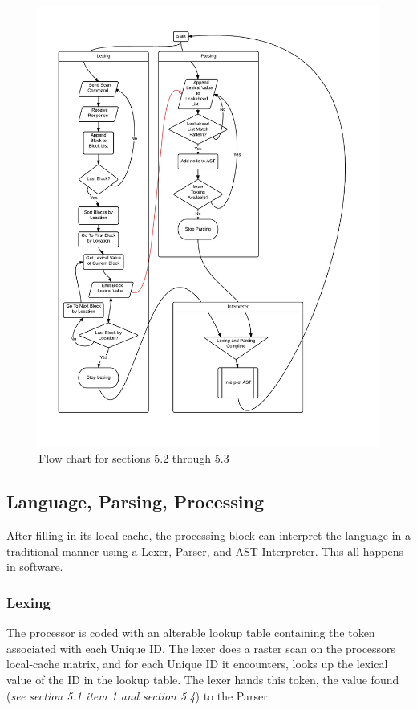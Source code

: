        \begin{figure}[H]
         \centering
          \includegraphics[width=6in]{central_processor_stages}
          \caption{Flow chart for sections 5.2 through 5.3}
         \end{figure}
  \subsection{Language, Parsing, Processing}
    After filling in its local-cache, the processing block can interpret the language in a traditional manner using a Lexer, Parser, and AST-Interpreter. This all happens in software.
    \subsubsection{Lexing}
      The processor is coded with an alterable lookup table containing the token associated with each Unique ID. The lexer does a raster scan on the processors local-cache matrix, and for each Unique ID it encounters, looks up the lexical value of the ID in the lookup table. The lexer hands this token, the value found (\textit{see section 5.1 item 1 and section 5.4}) to the Parser.
